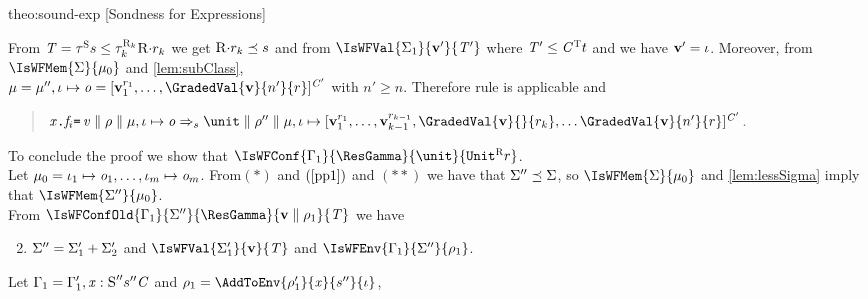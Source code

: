 \begin{proofOf}{theo:sound-exp} [Sondness for Expressions]
\begin{description}
\begin{quote}
\end{quote}
From $\mathit{T}=\tau^{\textsc{S}}{s}\leq\tau_k^{\textsc{R}_k}{\textsc{R}{\cdot}r_k}$ we get $\textsc{R}{\cdot}r_k\preceq s$ and from $\IsWFVal{\Sigma_1}{\val'}{\T'}$ where $\mathit{T}'\leq\mathit{C}^{\textsc{T}}{t}$ and 
 we have $\mathbf{v}'=\iota$. Moreover, from  $\IsWFMem{\Sigma}{\mem_0}$  and \cref{lem:subClass},\\ 
$\mem=\mem'',\MemElem{\loc}{}{\obj=\Obj{{\C'}}{\GradedValInd{\val}{1}{\rgr},\ldots,\GradedVal{\val}{n'}{\rgr}}}$ with $n'\geq n$.
%
Therefore rule  is applicable and
\begin{quote}
$\reduce{\Conf{\FieldUpdate{\x}{\f_i}{\ve}}{\env}{\mem,\MemElem{\loc}{\obj}}}{\sgr}{\Conf{\unit}{\env''}{\mem,\MemElem{\loc}{\Obj{{\C'}}{\GradedValInd{\val}{1}{\rgr},\ldots,\GradedValInd{\val}{k-1}{\rgr},\GradedVal{\val}{}{{\rgr_k}},\ldots\GradedVal{\val}{n'}{\rgr}}}}}$.
\end{quote}
To conclude the proof we show that $\IsWFConf{\Gamma_1}{\ResGamma}{\unit}{\Graded{\Unit}{\Rgr}{\rgr}}$.\\
%
Let $\mu_0=\iota_1\mapsto\mathit{o}_1,\ldots,\iota_m\mapsto\mathit{o}_m$. From$(\ast)$ and  $(\ref{pp1})$ and $(\ast\ast)$ we have that $\Sigma''\preceq\Sigma$, so 
$\IsWFMem{\Sigma}{\mem_0}$ and \cref{lem:lessSigma} imply that $\IsWFMem{\Sigma''}{\mem_0}$. \\
%
From $\IsWFConfOld{\Gamma_1}{\Sigma''}{\ResGamma}{\VConf{\val}{\env_1}}{\T}$ we have 
\begin{enumerate}[(1)]\setcounter{enumi}{1}
\item\label{pp2}  
$\Sigma''=\Sigma'_1+\Sigma'_2$ and $\IsWFVal{\Sigma'_1}{\val}{\T}$  and  $\IsWFEnv{\Gamma_1}{\Sigma''}{\env_1}$.
\end{enumerate}
Let $\Gamma_1=\Gamma'_1,\mathit{x} :\textsc{S}''{s''}{\mathit{C}}$ and $\env_1=\AddToEnv{\env'_1}{\x}{\sgr''}{\loc}$,
\epa


\bigskip
\bigskip
\item [Case $\e=\MethCall{\bez\x\eez}{\m}{\vs}$]
\item [Case $\e=\Free{\ve}$]
%

\end{description}


\end{proofOf}

%



